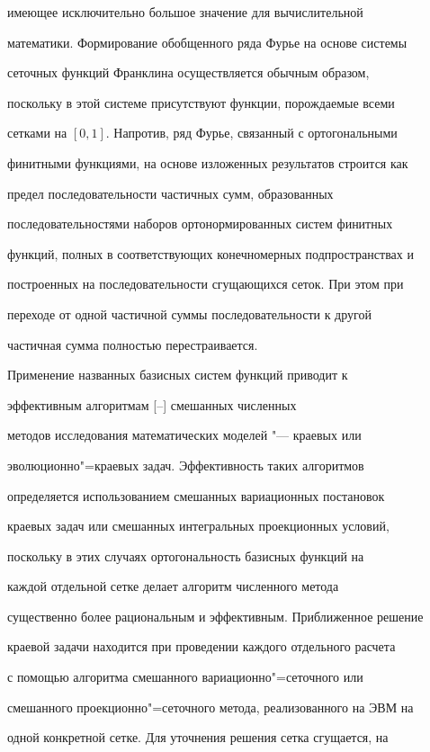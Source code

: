 имеющее исключительно большое значение для вычислительной

математики. Формирование обобщенного ряда Фурье на основе системы

сеточных функций Франклина осуществляется обычным образом,

поскольку в этой системе присутствуют функции, порождаемые всеми

сетками на $[0, 1]$. Напротив, ряд Фурье, связанный с ортогональными

финитными функциями, на основе изложенных результатов строится как

предел последовательности частичных сумм, образованных

последовательностями наборов ортонормированных систем финитных

функций, полных в соответствующих конечномерных подпространствах и

построенных на последовательности сгущающихся сеток. При этом при

переходе от одной частичной суммы последовательности к другой

частичная сумма полностью перестраивается.



Применение названных базисных систем функций приводит к

эффективным алгоритмам [--] смешанных численных

методов исследования математических моделей "--- краевых или

эволюционно"=краевых задач. Эффективность таких алгоритмов

определяется использованием смешанных вариационных постановок

краевых задач или смешанных интегральных проекционных условий,

поскольку в этих случаях ортогональность базисных функций на

каждой отдельной сетке делает алгоритм численного метода

существенно более рациональным и эффективным. Приближенное решение

краевой задачи находится при проведении каждого отдельного расчета

с помощью алгоритма смешанного вариационно"=сеточного или

смешанного проекционно"=сеточного метода, реализованного на ЭВМ на

одной конкретной сетке. Для уточнения решения сетка сгущается, на

